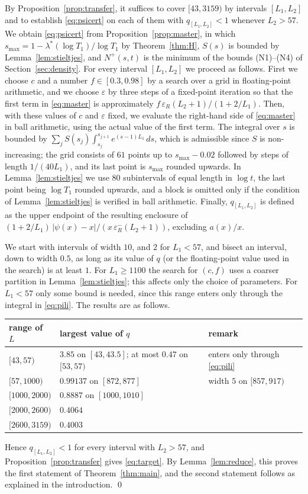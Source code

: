 \documentclass[11pt]{amsart}
\numberwithin{equation}{section}
\theoremstyle{definition}
\theoremstyle{remark}
\newcommand{\eps}{\varepsilon}
\begin{document}
By Proposition~\ref{prop:transfer}, it suffices to cover $[43, 3159)$ by intervals $[L_1, L_2]$ and to establish \eqref{eq:psicert} on each of them with $q_{[L_1,L_2]} < 1$ whenever $L_2 > 57$.
We obtain \eqref{eq:psicert} from Proposition~\ref{prop:master}, in which $s_{\max} = 1 - \lambda^*(\log T_1)/\log T_1$ by Theorem~\ref{thm:H}, $S(s)$ is bounded by Lemma~\ref{lem:stieltjes}, and $N^+(s, t)$ is the minimum of the bounds (N1)--(N4) of Section~\ref{sec:density}.
For every interval $[L_1, L_2]$ we proceed as follows.
First we choose $c$ and a number $f \in [0.3, 0.98]$ by a search over a grid in floating-point arithmetic, and we choose $\eps$ by three steps of a fixed-point iteration so that the first term in \eqref{eq:master} is approximately $f\,\eps_R(L_2 + 1)/(1 + 2/L_1)$.
Then, with these values of $c$ and $\eps$ fixed, we evaluate the right-hand side of \eqref{eq:master} in ball arithmetic, using the actual value of the first term.
The integral over $s$ is bounded by $\sum_jS(s_j)\int_{s_j}^{s_{j+1}}e^{(s-1)L_1}\,ds$, which is admissible since $S$ is non-increasing; the grid consists of $61$ points up to $s_{\max} - 0.02$ followed by steps of length $1/(40L_1)$, and its last point is $s_{\max}$ rounded upwards.
In Lemma~\ref{lem:stieltjes} we use $80$ subintervals of equal length in $\log t$, the last point being $\log T_1$ rounded upwards, and a block is omitted only if the condition of Lemma~\ref{lem:stieltjes} is verified in ball arithmetic.
Finally, $q_{[L_1,L_2]}$ is defined as the upper endpoint of the resulting enclosure of $(1 + 2/L_1)\,|\psi(x) - x|/(x\,\eps_R^-(L_2+1))$, excluding $a(x)/x$.

We start with intervals of width $10$, and $2$ for $L_1 < 57$, and bisect an interval, down to width $0.5$, as long as its value of $q$ (or the floating-point value used in the search) is at least $1$.
For $L_1 \geq 1100$ the search for $(c, f)$ uses a coarser partition in Lemma~\ref{lem:stieltjes}; this affects only the choice of parameters.
For $L_1 < 57$ only some bound is needed, since this range enters only through the integral in \eqref{eq:pili}.
The results are as follows.
\begin{center}
\begin{tabular}{lll}
\toprule
range of $L$ & largest value of $q$ & remark\\
\midrule
$[43, 57)$ & $3.85$ on $[43, 43.5]$; at most $0.47$ on $[53, 57)$ & enters only through \eqref{eq:pili}\\
$[57, 1000)$ & $0.99137$ on $[872, 877]$ & width $5$ on $[857, 917)$\\
$[1000, 2000)$ & $0.8887$ on $[1000, 1010]$ & \\
$[2000, 2600)$ & $0.4064$ & \\
$[2600, 3159)$ & $0.4003$ & \\
\bottomrule
\end{tabular}
\end{center}
Hence $q_{[L_1, L_2]} < 1$ for every interval with $L_2 > 57$, and Proposition~\ref{prop:transfer} gives \eqref{eq:target}.
By Lemma~\ref{lem:reduce}, this proves the first statement of Theorem~\ref{thm:main}, and the second statement follows as explained in the introduction.
\qed
\end{document}
